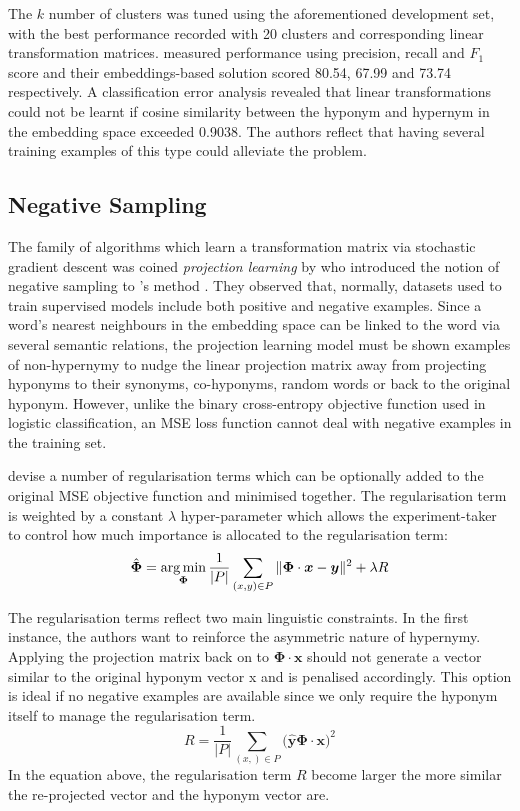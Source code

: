 The $k$ number of clusters was tuned using the aforementioned development set, with the best performance recorded with 20 clusters and corresponding linear transformation matrices.  \citeauthor{Fu2014} measured performance using precision, recall and $F_1$ score and their embeddings-based solution scored 80.54, 67.99 and 73.74 respectively.  A classification error analysis revealed that linear transformations could not be learnt if cosine similarity between the hyponym and hypernym in the embedding space exceeded 0.9038.  The authors reflect that having several training examples of this type could alleviate the problem.

\subsection{Negative Sampling} \label{Ustalov}
The family of algorithms which learn a transformation matrix via stochastic gradient descent was coined \textit{projection learning} by 
\citeauthor{ustalov2017negative} who introduced the notion of negative sampling to \citeauthor{Fu2014}'s method \citep{ustalov2017negative}.  They observed that, normally, datasets used to train supervised models include both positive and negative examples.  Since a word’s nearest neighbours in the embedding space can be linked to the word via several semantic relations, the projection learning model must be shown examples of non-hypernymy to nudge the linear projection matrix away from projecting hyponyms to their synonyms, co-hyponyms, random words or back to the original hyponym.  However, unlike the binary cross-entropy objective function used in logistic classification, an \ac{MSE} loss function cannot deal with negative examples in the training set.

\citeauthor{ustalov2017negative} devise a number of regularisation terms which can be optionally added to the original \ac{MSE} objective function and minimised together.  The regularisation term is weighted by a constant $\lambda$ hyper-parameter which allows the experiment-taker to control how much importance is allocated to the regularisation term:
\[\hat{\bm{\Phi}} = \operatorname*{arg\,min}_{\bm{\Phi}} \frac{1}{\vert P \vert} \sum_{(x,y) \in P} \Vert \bm{\Phi}\cdot\bm{x} - \bm {y} \Vert^2 + \lambda R\]

The regularisation terms reflect two main linguistic constraints.  In the first instance, the authors want to reinforce the asymmetric nature of hypernymy.  Applying the projection matrix back on to $\bm{\Phi} \cdot \bm{x}$ should not generate a vector similar to the original hyponym vector x and is penalised accordingly.  This option is ideal if no negative examples are available since we only require the hyponym itself to manage the regularisation term.
\[R = \frac{1}{\vert P \vert} \sum_{(x,) \in P} \big( \hat{\bm{y}} \bm{\Phi} \cdot \bm{x} \big)^2  \]
In the equation above, the regularisation term $R$ become larger the more similar the re-projected vector and the hyponym vector are. 

